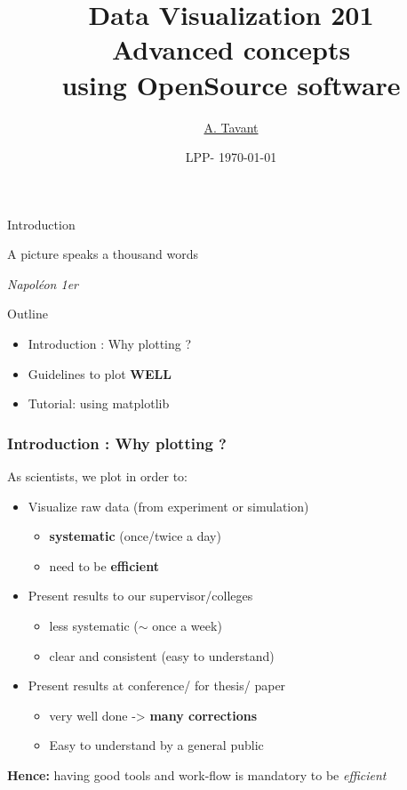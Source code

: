 \documentclass[sans, aspectratio=169]{beamer}
\title{
\textbf{{\LARGE Data Visualization 201}}\\
Advanced concepts \\ using OpenSource software
}
\date{LPP- \today}
\author{\underline{A. Tavant}}
\begin{document}
\begin{frame}
\titlepage
\end{frame}

\begin{frame}{Introduction} 
	
	\epigraph{A picture speaks a thousand words}{\textit{Napoléon 1er}}

\end{frame}

\begin{frame}{Outline} 

	\begin{itemize}
	\item Introduction : Why plotting ?
	\item Guidelines to plot {\bf WELL}
	\item Tutorial: using matplotlib
	
	\end{itemize}
\end{frame}


\begin{frame} 
	\frametitle{Introduction : Why plotting ?} 
	As scientists, we plot in order to:
	\begin{itemize}
	\item Visualize raw data (from experiment or simulation)
		\begin{itemize}
		\item<2-> \textbf{systematic} (once/twice a day)
		\item<2-> need to be \textbf{efficient} 
		\end{itemize}
	\item Present results to our supervisor/colleges
		\begin{itemize}
		\item<3-> less systematic ($\sim$ once a week)
		\item<3-> clear and consistent (easy to understand)
		\end{itemize}
	\item Present results at conference/ for thesis/ paper
		\begin{itemize}
		\item<4-> very well done ->\textbf{ many corrections}
		\item<4-> Easy to understand by a general public 
		\end{itemize}
	\end{itemize}
	
	\pause \pause \pause \pause
	{\bf Hence:} having good tools and work-flow is mandatory to be {\it efficient}
\end{frame}
\end{document}
